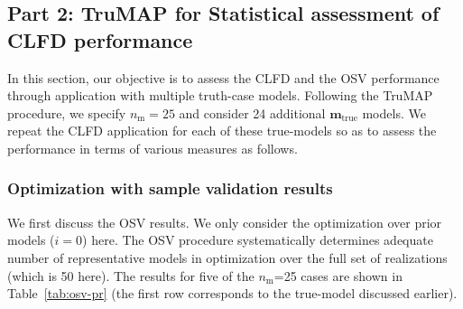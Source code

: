 \documentclass[11pt]{article}
\begin{document}
\subsection{Part 2: TruMAP for Statistical assessment of CLFD performance} \label{results:multiruns}
In this section, our objective is to assess the CLFD and the OSV performance through application with multiple truth-case models.
Following the TruMAP procedure, we specify $n_{\text{m}} =25$ and consider 24 additional $\mathbf{m}_{\text{true}}$ models.
We repeat the CLFD application for each of these true-models
so as to assess the performance in terms of various measures as follows.

\subsubsection{Optimization with sample validation results} \label{results:multiruns}
We first discuss the OSV results. We only consider the optimization over prior models ($i=0$) here.
The OSV procedure systematically determines adequate number of representative models in optimization over the full set of realizations (which is 50 here).
The results for five of the $n_{\text{m}}$=25 cases are shown in Table~\ref{tab:osv-pr} (the first row corresponds to the true-model discussed earlier).
%
%
\end{document}
